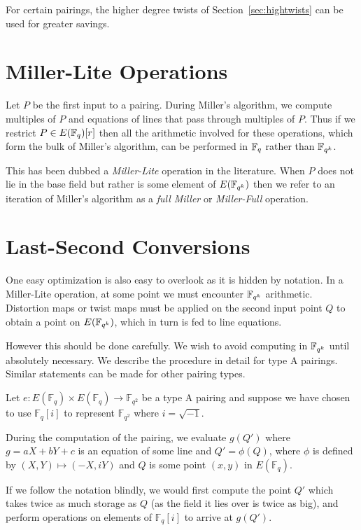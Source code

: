 For certain pairings, the higher degree twists of Section~\ref{sec:hightwists}
can be used for greater savings.

\section {Miller-Lite Operations}

Let $P$ be the first input to a pairing. During Miller's algorithm, we compute
multiples of $P$ and equations of lines that pass through multiples of $P$.
Thus if we restrict $P \in E(\mathbb{F}_q)[r]$ then all the arithmetic involved for
these operations, which form the bulk of Miller's algorithm, can be performed
in $\mathbb{F}_q$ rather than $\mathbb{F}_{q^k}$.

This has been dubbed a \emph{Miller-Lite} operation in the literature.
When $P$ does not lie in the base field but rather is some element of
$E(\mathbb{F}_{q^k})$ then we refer to an iteration of Miller's algorithm
as a \emph{full Miller} or \emph{Miller-Full} operation.

\section{Last-Second Conversions}

One easy optimization is also easy to overlook as it is hidden by notation. In
a Miller-Lite operation, at some point we must encounter $\mathbb{F}_{q^k}$ arithmetic.
Distortion maps or twist maps must be applied on the second input point $Q$ to
obtain a point on $E(\mathbb{F}_{q^k})$, which in turn is fed to line equations.

However this should be done carefully. We wish to avoid computing in $\mathbb{F}_{q^k}$
until absolutely necessary. We describe the procedure in detail for type A
pairings. Similar statements can be made for other pairing types.

Let $e : E(\mathbb{F}_q) \times E(\mathbb{F}_q)
\rightarrow \mathbb{F}_{q^2}$ be a type A pairing 
and suppose we have chosen to
use $\mathbb{F}_q [i]$ to represent $\mathbb{F}_{q^2}$ where $i =\sqrt{-1}$.

During the computation of the pairing,
we evaluate $g(Q')$ where $g = aX + bY + c$ is an equation of some line and
$Q' = \phi(Q)$, where $\phi$ is defined by  $(X,Y) \mapsto (-X, iY)$
and $Q$ is some point $(x,y)$ in $E(\mathbb{F}_q)$.

If we follow the notation blindly, we would first compute the point
$Q'$ which takes twice as much storage as $Q$ (as the field it lies over is
twice as big), and perform operations on elements of $\mathbb{F}_q[i]$ to
arrive at $g(Q')$.

